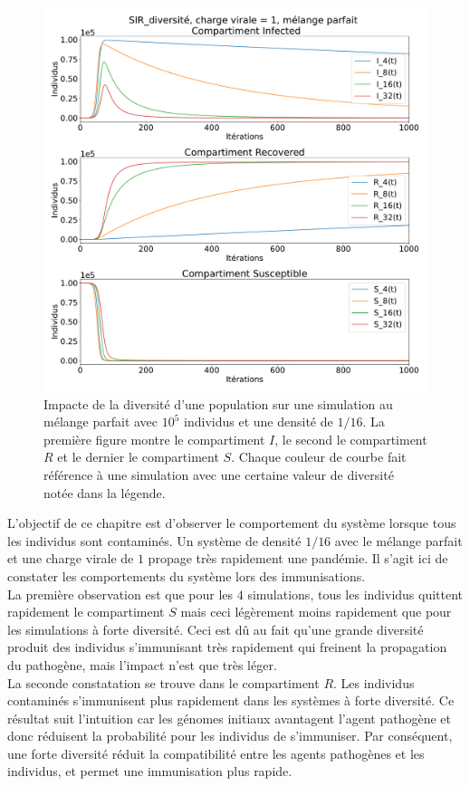 \newpage

\begin{figure}[h]
	\centering
	\captionsetup{justification=centering}
	\includegraphics[width=.8\textwidth]{Images/SIR_diversite_mix.pdf}
	\caption[Impacte de la diversité]{Impacte de la diversité d'une population sur une simulation au mélange parfait avec $10^5$ individus et une densité de $1/16$. La première figure montre le compartiment $I$, le second le compartiment $R$ et le dernier le compartiment $S$. Chaque couleur de courbe fait référence à une simulation avec une certaine valeur de diversité notée dans la légende.}
\end{figure}

L'objectif de ce chapitre est d'observer le comportement du système lorsque tous les individus sont contaminés. Un système de densité $1/16$ avec le mélange parfait et une charge virale de $1$ propage très rapidement une pandémie. Il s'agit ici de constater les comportements du système lors des immunisations.\\

La première observation est que pour les $4$ simulations, tous les individus quittent rapidement le compartiment $S$ mais ceci légèrement moins rapidement que pour les simulations à forte diversité. Ceci est dû au fait qu'une grande diversité produit des individus s'immunisant très rapidement qui freinent la propagation du pathogène, mais l'impact n'est que très léger.\\

La seconde constatation se trouve dans le compartiment $R$. Les individus contaminés s'immunisent plus rapidement dans les systèmes à forte diversité. Ce résultat suit l'intuition car les génomes initiaux avantagent l'agent pathogène et donc réduisent la probabilité pour les individus de s'immuniser. Par conséquent, une forte diversité réduit la compatibilité entre les agents pathogènes et les individus, et permet une immunisation plus rapide.

